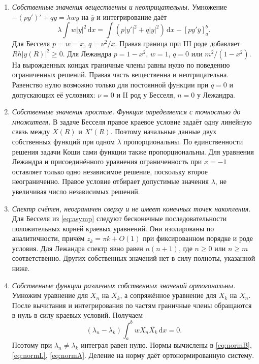 \documentclass[12pt,a4paper]{article}
\newcommand{\dd}{\,\mathrm{d}}
\begin{document}
\begin{enumerate}
\item \emph{Собственные значения вещественны и неотрицательны.}
Умножение $-(py')'+qy=\lambda wy$ на $\overline y$ и интегрирование даёт
\begin{equation}\label{eq:energy}
\lambda\int w|y|^2\dd x=
\int(p|y'|^2+q|y|^2)\dd x-[p y'\overline y]_{a}^{b}.
\end{equation}
Для Бесселя $p=w=x$, $q=\nu^2/x$. Правая граница при III роде добавляет $Rh|y(R)|^2\ge0$. Для Лежандра $p=1-x^2$, $w=1$, $q=0$ или $m^2/(1-x^2)$. На вырожденных концах граничные члены равны нулю по поведению ограниченных решений. Правая часть вещественна и неотрицательна. Равенство нулю возможно только для постоянной функции при $q=0$ и допускающих её условиях: $\nu=0$ и II род у Бесселя, $n=0$ у Лежандра.

\item \emph{Собственные значения простые. Функция определяется с точностью до множителя.}
В задаче Бесселя правое краевое условие задаёт одну линейную связь между $X(R)$ и $X'(R)$. Поэтому начальные данные двух собственных функций при одном $\lambda$ пропорциональны. По единственности решения задачи Коши сами функции также пропорциональны. Для уравнения Лежандра и присоединённого уравнения ограниченность при $x=-1$ оставляет только одно независимое решение, поскольку второе неограниченно. Правое условие отбирает допустимые значения $\lambda$, не увеличивая число независимых решений.

\item \emph{Спектр счётен, неограничен сверху и не имеет конечных точек накопления.}
Для Бесселя из \eqref{eq:asymp} следуют бесконечные последовательности положительных корней краевых уравнений. Они изолированы по аналитичности, причём $z_k=\pi k+O(1)$ при фиксированном порядке и роде условия. Для Лежандра спектр явно равен $n(n+1)$, где $n\ge0$ или $n\ge m$ соответственно. Других собственных значений нет в силу полноты, указанной ниже.

\item \emph{Собственные функции различных собственных значений ортогональны.}
Умножим уравнение для $X_n$ на $\overline{X_k}$, а сопряжённое уравнение для $X_k$ на $X_n$. После вычитания и интегрирования по частям граничные члены обращаются в нуль в силу краевых условий. Получаем
\[
(\lambda_n-\lambda_k)\int_a^b wX_n\overline{X_k}\dd x=0.
\]
Поэтому при $\lambda_n\ne\lambda_k$ интеграл равен нулю. Нормы вычислены в \eqref{eq:normB}, \eqref{eq:normL}, \eqref{eq:normA}. Деление на норму даёт ортонормированную систему.


\end{enumerate}
\end{document}
